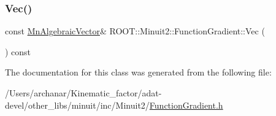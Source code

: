 \mbox{\label{classROOT_1_1Minuit2_1_1FunctionGradient_abdf0fd7d9e1a730049112f0c903a9f5f}} 
\subsubsection{\texorpdfstring{Vec()}{Vec()}\hspace{0.1cm}{\footnotesize\ttfamily [3/3]}}
{\footnotesize\ttfamily const \mbox{\hyperlink{namespaceROOT_1_1Minuit2_a62ed97730a1ca8d3fbaec64a19aa11c9}{Mn\+Algebraic\+Vector}}\& R\+O\+O\+T\+::\+Minuit2\+::\+Function\+Gradient\+::\+Vec (\begin{DoxyParamCaption}{ }\end{DoxyParamCaption}) const\hspace{0.3cm}{\ttfamily [inline]}}



The documentation for this class was generated from the following file\+:\begin{DoxyCompactItemize}
\item 
/\+Users/archanar/\+Kinematic\+\_\+factor/adat-\/devel/other\+\_\+libs/minuit/inc/\+Minuit2/\mbox{\hyperlink{adat-devel_2other__libs_2minuit_2inc_2Minuit2_2FunctionGradient_8h}{Function\+Gradient.\+h}}\end{DoxyCompactItemize}
